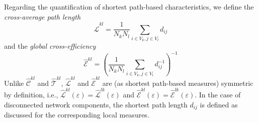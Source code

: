 		Regarding the quantification of shortest path-based characteristics, we define the \textit{cross-average path length}
\begin{equation}
\hat{\mathcal{L}}^{kl} = \frac{1}{N_k N_l} \sum_{i \in V_k, j \in V_l} d_{ij} %
\label{eq:apl_cross}
\end{equation}
and the \textit{global cross-efficiency}
\begin{equation}
\hat{\mathcal{E}}^{kl} = \left( \frac{1}{N_k N_l} \sum_{i \in V_k, j \in V_l} d_{ij}^{-1} \right)^{-1} %
\label{eq:globefficiency_cross}
\end{equation}
\noindent
Unlike $\hat{\mathcal{C}}^{kl}$ and $\hat{\mathcal{T}}^{kl}$, $\hat{\mathcal{L}}^{kl}$ and $\hat{\mathcal{E}}^{kl}$ are (as shortest path-based measures) symmetric by definition, i.e., $\hat{\mathcal{L}}^{kl}(\varepsilon)=\hat{\mathcal{L}}^{lk}(\varepsilon)$ and $\hat{\mathcal{E}}^{kl}(\varepsilon)=\hat{\mathcal{E}}^{lk}(\varepsilon)$. In the case of disconnected network components, the shortest path length $d_{ij}$ is defined as discussed for the corresponding local measures.


